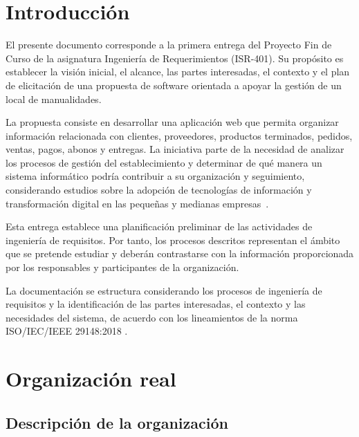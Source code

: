 \documentclass[11pt,a4paper]{article}
\begin{document}
	
	\tableofcontents
	\listoffigures
	\listoftables
	\newpage
	
	
	\section{Introducción}
	
	El presente documento corresponde a la primera entrega del Proyecto Fin de Curso de la asignatura Ingeniería de Requerimientos (ISR-401). Su propósito es establecer la visión inicial, el alcance, las partes interesadas, el contexto y el plan de elicitación de una propuesta de software orientada a apoyar la gestión de un local de manualidades.
	
	La propuesta consiste en desarrollar una aplicación web que permita organizar información relacionada con clientes, proveedores, productos terminados, pedidos, ventas, pagos, abonos y entregas. La iniciativa parte de la necesidad de analizar los procesos de gestión del establecimiento y determinar de qué manera un sistema informático podría contribuir a su organización y seguimiento, considerando estudios sobre la adopción de tecnologías de información y transformación digital en las pequeñas y medianas empresas~\cite{yuwono2024ict,diazarancibia2024digital}.
	
	Esta entrega establece una planificación preliminar de las actividades de ingeniería de requisitos. Por tanto, los procesos descritos representan el ámbito que se pretende estudiar y deberán contrastarse con la información proporcionada por los responsables y participantes de la organización.
	
	La documentación se estructura considerando los procesos de ingeniería de requisitos y la identificación de las partes interesadas, el contexto y las necesidades del sistema, de acuerdo con los lineamientos de la norma ISO/IEC/IEEE 29148:2018 \cite{iso29148}.
	
	
	\section{Organización real}
	
	\subsection{Descripción de la organización}
	
\end{document}
